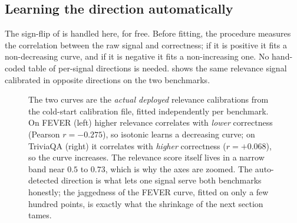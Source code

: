 \subsection*{Learning the direction automatically}

The sign-flip of  is handled here, for free. Before
fitting, the procedure measures the correlation between the raw signal and
correctness; if it is positive it fits a non-decreasing curve, and if it is negative
it fits a non-increasing one. No hand-coded table of per-signal directions is needed.
 shows the same relevance signal calibrated in opposite directions
on the two benchmarks.

\begin{figure}[htbp]
\centering
{}
\caption[The same signal, calibrated both ways]{The two curves are the \emph{actual
deployed} relevance calibrations from the cold-start calibration file, fitted
independently per benchmark. On FEVER (left) higher relevance correlates with
\emph{lower} correctness (Pearson $r=-0.275$), so isotonic learns a decreasing curve;
on TriviaQA (right) it correlates with \emph{higher} correctness ($r=+0.068$), so the
curve increases. The relevance score itself lives in a narrow band near $0.5$ to
$0.73$, which is why the axes are zoomed. The auto-detected direction is what lets one
signal serve both benchmarks honestly; the jaggedness of the FEVER curve, fitted on
only a few hundred points, is exactly what the shrinkage of the next section tames.}
\label{fig:signflip}
\end{figure}


